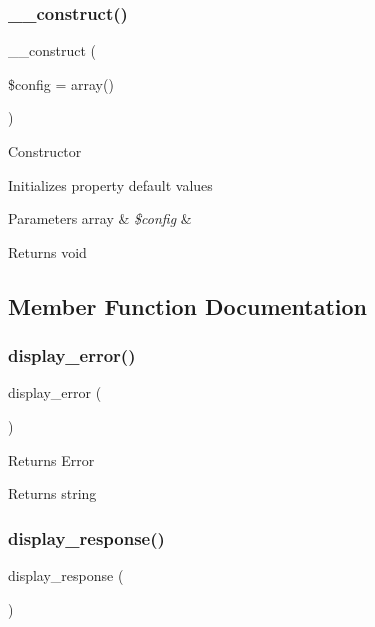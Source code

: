 \subsubsection{\texorpdfstring{\+\_\+\+\_\+construct()}{\_\_construct()}}
{\footnotesize\ttfamily \+\_\+\+\_\+construct (\begin{DoxyParamCaption}\item[{}]{\$config = {\ttfamily array()} }\end{DoxyParamCaption})}

Constructor

Initializes property default values


\begin{DoxyParams}[1]{Parameters}
array & {\em \$config} & \\
\hline
\end{DoxyParams}
\begin{DoxyReturn}{Returns}
void 
\end{DoxyReturn}


\subsection{Member Function Documentation}
\mbox{\label{class_c_i___xmlrpc_adf0d809d39e17bc0e08387436db31386}} 
\subsubsection{\texorpdfstring{display\+\_\+error()}{display\_error()}}
{\footnotesize\ttfamily display\+\_\+error (\begin{DoxyParamCaption}{ }\end{DoxyParamCaption})}

Returns Error

\begin{DoxyReturn}{Returns}
string 
\end{DoxyReturn}
\mbox{\label{class_c_i___xmlrpc_a3a8aedc2a1e6a67ad248dc6078ce8614}} 
\subsubsection{\texorpdfstring{display\+\_\+response()}{display\_response()}}
{\footnotesize\ttfamily display\+\_\+response (\begin{DoxyParamCaption}{ }\end{DoxyParamCaption})}

